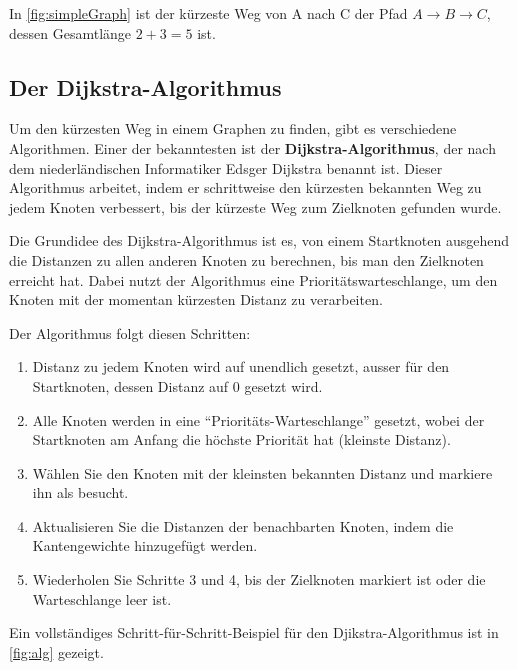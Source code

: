 In \cref{fig:simpleGraph} ist der kürzeste Weg von A nach C der Pfad $A \rightarrow B \rightarrow C$, dessen Gesamtlänge $2 + 3 = 5$ ist.

\subsection{Der Dijkstra-Algorithmus}

Um den kürzesten Weg in einem Graphen zu finden, gibt es verschiedene Algorithmen. Einer der bekanntesten ist der \textbf{Dijkstra-Algorithmus}, der nach dem niederländischen Informatiker Edsger Dijkstra benannt ist. Dieser Algorithmus arbeitet, indem er schrittweise den kürzesten bekannten Weg zu jedem Knoten verbessert, bis der kürzeste Weg zum Zielknoten gefunden wurde.

Die Grundidee des Dijkstra-Algorithmus ist es, von einem Startknoten ausgehend die Distanzen zu allen anderen Knoten zu berechnen, bis man den Zielknoten erreicht hat. Dabei nutzt der Algorithmus eine Prioritätswarteschlange, um den Knoten mit der momentan kürzesten Distanz zu verarbeiten.

Der Algorithmus folgt diesen Schritten:

\begin{enumerate}
    \item Distanz zu jedem Knoten wird auf unendlich gesetzt, ausser für den Startknoten, dessen Distanz auf 0 gesetzt wird.
    \item Alle Knoten werden in eine \enquote{Prioritäts-Warteschlange} gesetzt, wobei der Startknoten am Anfang die höchste Priorität hat (kleinste Distanz).
    \item Wählen Sie den Knoten mit der kleinsten bekannten Distanz und markiere ihn als besucht.
    \item Aktualisieren Sie die Distanzen der benachbarten Knoten, indem die Kantengewichte hinzugefügt werden.
    \item Wiederholen Sie Schritte 3 und 4, bis der Zielknoten markiert ist oder die Warteschlange leer ist.
\end{enumerate}


Ein vollständiges Schritt-für-Schritt-Beispiel für den Djikstra-Algorithmus ist in \cref{fig:alg} gezeigt.

